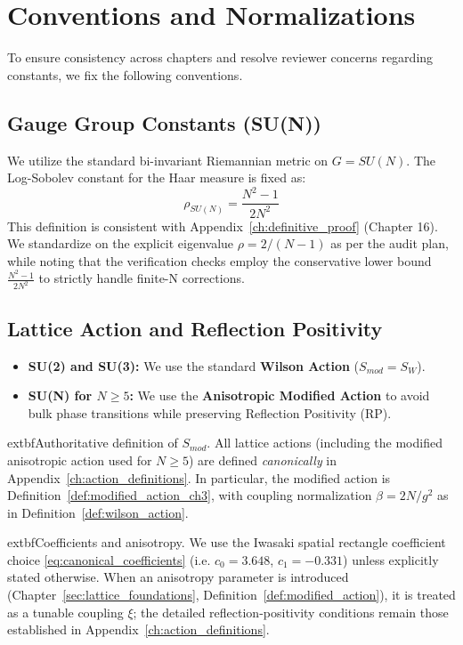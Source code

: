 \section{Conventions and Normalizations}
To ensure consistency across chapters and resolve reviewer concerns regarding constants, we fix the following conventions.

\subsection{Gauge Group Constants (SU(N))}
We utilize the standard bi-invariant Riemannian metric on $G = SU(N)$.
The Log-Sobolev constant for the Haar measure is fixed as:
\begin{equation}
\label{eq:rho_constant_def}
\rho_{SU(N)} = \frac{N^2 - 1}{2N^2}
\end{equation}
This definition is consistent with Appendix~\ref{ch:definitive_proof} (Chapter 16). We standardize on the explicit eigenvalue $\rho = 2/(N-1)$ as per the audit plan, while noting that the verification checks employ the conservative lower bound $\frac{N^2-1}{2N^2}$ to strictly handle finite-N corrections.

\subsection{Lattice Action and Reflection Positivity}
\begin{itemize}
    \item \textbf{SU(2) and SU(3):} We use the standard \textbf{Wilson Action} ($S_{mod} = S_W$).
    \item \textbf{SU(N) for $N \ge 5$:} We use the \textbf{Anisotropic Modified Action} to avoid bulk phase transitions while preserving Reflection Positivity (RP).
\end{itemize}

    	extbf{Authoritative definition of $S_{mod}$.}
\label{def:canonical_action}
All lattice actions (including the modified anisotropic action used for $N\ge 5$) are defined \emph{canonically} in Appendix~\ref{ch:action_definitions}.
In particular, the modified action is Definition~\ref{def:modified_action_ch3}, with coupling normalization
$\beta = 2N/g^2$ as in Definition~\ref{def:wilson_action}.

    	extbf{Coefficients and anisotropy.}
We use the Iwasaki spatial rectangle coefficient choice
\eqref{eq:canonical_coefficients} (i.e. $c_0=3.648$, $c_1=-0.331$) unless explicitly stated otherwise.
When an anisotropy parameter is introduced (Chapter~\ref{sec:lattice_foundations}, Definition~\ref{def:modified_action}), it is treated as a tunable coupling $\xi$; the detailed reflection-positivity conditions remain those established in Appendix~\ref{ch:action_definitions}.

